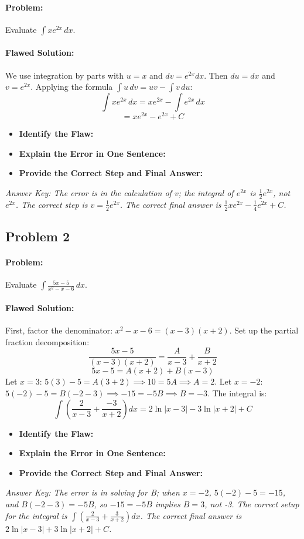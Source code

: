 \documentclass{article}
\begin{document}
\paragraph{Problem:} Evaluate $\int x e^{2x} \, dx$.
\paragraph{Flawed Solution:}
We use integration by parts with $u=x$ and $dv=e^{2x}dx$.
Then $du=dx$ and $v=e^{2x}$.
Applying the formula $\int u \, dv = uv - \int v \, du$:
\[ \int x e^{2x} \, dx = x e^{2x} - \int e^{2x} \, dx \]
\[ = x e^{2x} - e^{2x} + C \]
\begin{itemize}
    \item \textbf{Identify the Flaw:}
    \item \textbf{Explain the Error in One Sentence:}
    \item \textbf{Provide the Correct Step and Final Answer:}
\end{itemize}
\textit{Answer Key: The error is in the calculation of $v$; the integral of $e^{2x}$ is $\frac{1}{2}e^{2x}$, not $e^{2x}$. The correct step is $v=\frac{1}{2}e^{2x}$. The correct final answer is $\frac{1}{2}xe^{2x} - \frac{1}{4}e^{2x} + C$.}

\subsection{Problem 2}
\paragraph{Problem:} Evaluate $\int \frac{5x-5}{x^2 - x - 6} \, dx$.
\paragraph{Flawed Solution:}
First, factor the denominator: $x^2 - x - 6 = (x-3)(x+2)$.
Set up the partial fraction decomposition:
\[ \frac{5x-5}{(x-3)(x+2)} = \frac{A}{x-3} + \frac{B}{x+2} \]
\[ 5x-5 = A(x+2) + B(x-3) \]
Let $x=3$: $5(3)-5 = A(3+2) \implies 10 = 5A \implies A=2$.
Let $x=-2$: $5(-2)-5 = B(-2-3) \implies -15 = -5B \implies B=-3$.
The integral is:
\[ \int \left( \frac{2}{x-3} + \frac{-3}{x+2} \right) dx = 2\ln|x-3| - 3\ln|x+2| + C \]
\begin{itemize}
    \item \textbf{Identify the Flaw:}
    \item \textbf{Explain the Error in One Sentence:}
    \item \textbf{Provide the Correct Step and Final Answer:}
\end{itemize}
\textit{Answer Key: The error is in solving for B; when $x=-2$, $5(-2)-5 = -15$, and $B(-2-3) = -5B$, so $-15 = -5B$ implies $B=3$, not -3. The correct setup for the integral is $\int (\frac{2}{x-3} + \frac{3}{x+2}) dx$. The correct final answer is $2\ln|x-3| + 3\ln|x+2| + C$.}
\end{document}
